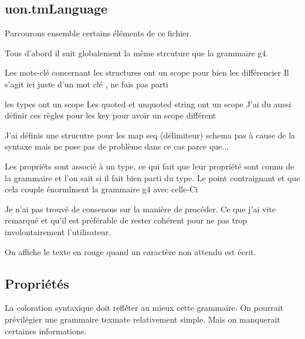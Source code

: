 \documentclass[
    iict, %
    il, %
]{heig-tb}
\begin{document}
\subsection{uon.tmLanguage}

Parcourons ensemble certains éléments de ce fichier.

Tous d'abord il suit globalement la même strcuture que la grammaire g4.


Les mots-clé concernant les structures ont un scope pour bien les différencier
Il s'agit ici juste d'un mot clé , ne fais pas parti

les types ont un scope
Les quoted et unquoted string ont un scope
J'ai du aussi définir ces règles pour les key pour avoir un scope différent

J'ai définis une strucutre pour les map seq (délimiteur) schema pas à cause de la syntaxe mais ne pose pas de problème dans ce cas parce que...

Les propriéts sont associé à un type, ce qui fait que leur propriété sont connu de la grammaire et l'on sait si il fait bien parti du type.
Le point contraignant et que cela couple énormlment la grammaire g4 avec celle-Ci


Je n'ai pas trouvé de consensus sur la manière de procéder. Ce que j'ai vite remarqué et qu'il est préférable de rester cohérent pour ne pas
trop involontairement l'utilisateur.


On affiche le texte en rouge quand un caractère non attendu est écrit.

\subsection{Propriétés}

La coloration syntaxique doit refléter au mieux cette grammaire. On pourrait prévilégier une grammaire texmate relativement simple. Mais on manquerait certaines informations.
\end{document}
